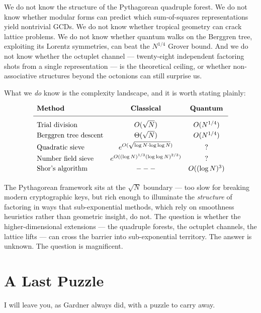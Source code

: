 \documentclass[11pt,openright,twoside]{book}
\theoremstyle{definition}
\begin{document}
We do not know the structure of the Pythagorean quadruple forest. We do not know whether modular forms can predict which sum-of-squares representations yield nontrivial GCDs. We do not know whether tropical geometry can crack lattice problems. We do not know whether quantum walks on the Berggren tree, exploiting its Lorentz symmetries, can beat the $N^{1/4}$ Grover bound. And we do not know whether the octuplet channel --- twenty-eight independent factoring shots from a single representation --- is the theoretical ceiling, or whether non-associative structures beyond the octonions can still surprise us.

What we \textit{do} know is the complexity landscape, and it is worth stating plainly:

\[
\begin{array}{lcc}
\textbf{Method} & \textbf{Classical} & \textbf{Quantum} \\[4pt]
\hline
\\[-6pt]
\text{Trial division} & O(\sqrt{N}) & O(N^{1/4}) \\[2pt]
\text{Berggren tree descent} & \Theta(\sqrt{N}) & O(N^{1/4}) \\[2pt]
\text{Quadratic sieve} & e^{O(\sqrt{\log N \cdot \log\log N})} & ? \\[2pt]
\text{Number field sieve} & e^{O((\log N)^{1/3}(\log\log N)^{2/3})} & ? \\[2pt]
\text{Shor's algorithm} & --- & O((\log N)^3) \\[2pt]
\end{array}
\]

The Pythagorean framework sits at the $\sqrt{N}$ boundary --- too slow for breaking modern cryptographic keys, but rich enough to illuminate the \textit{structure} of factoring in ways that sub-exponential methods, which rely on smoothness heuristics rather than geometric insight, do not. The question is whether the higher-dimensional extensions --- the quadruple forests, the octuplet channels, the lattice lifts --- can cross the barrier into sub-exponential territory. The answer is unknown. The question is magnificent.


\bigskip


\section{A Last Puzzle}

I will leave you, as Gardner always did, with a puzzle to carry away.
\end{document}
